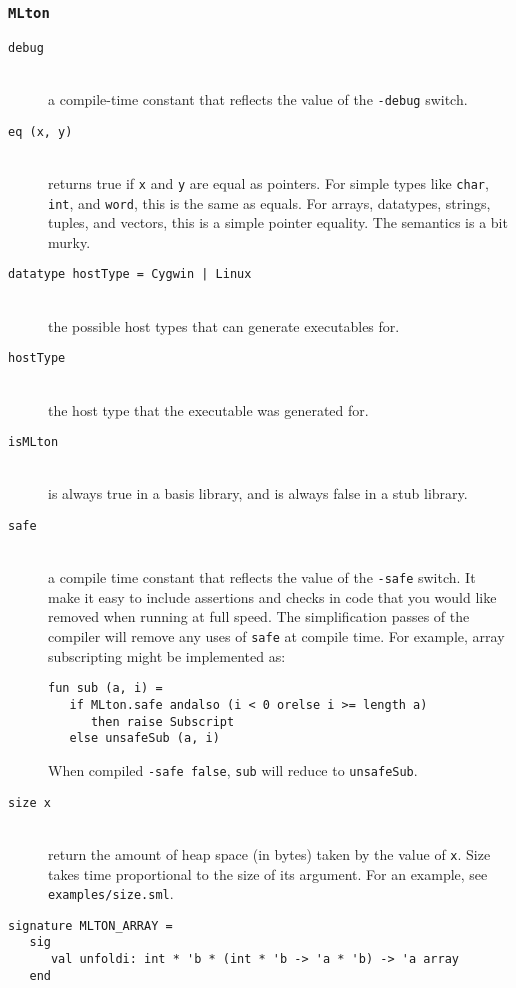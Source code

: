 \subsubsection{{\tt MLton}}

\newcommand{\entry}[1]{\item[\tt #1]\hspace{1in}\\}
\begin{description}

\entry{debug}
a compile-time constant that reflects the value of the {\tt -debug} switch.

\entry{eq (x, y)}
returns true if {\tt x} and {\tt y} are equal as pointers.  For simple types
like {\tt char}, {\tt int}, and {\tt word}, this is the same as equals.  For
arrays, datatypes, strings, tuples, and vectors, this is a simple pointer
equality.  The semantics is a bit murky.

\entry{datatype hostType = Cygwin | Linux}
the possible host types that {\mlton} can generate executables for.

\entry{hostType}
the host type that the executable was generated for.

\entry{isMLton}
is always true in a {\mlton} basis library, and is always false in a stub
library.

\entry{safe}
a compile time constant that reflects the value of the {\tt -safe} switch.  It
make it easy to include assertions and checks in code that you would like
removed when running at full speed. The simplification passes of the compiler
will remove any uses of {\tt safe} at compile time.  For example, array
subscripting might be implemented as:
\begin{verbatim}
fun sub (a, i) =
   if MLton.safe andalso (i < 0 orelse i >= length a)
      then raise Subscript
   else unsafeSub (a, i)
\end{verbatim}
When compiled {\tt -safe false}, {\tt sub} will reduce to
{\tt unsafeSub}.

\entry{size x}
return the amount of heap space (in bytes) taken by the value of {\tt x}.  Size
takes time proportional to the size of its argument.  For an example, see {\tt
examples/size.sml}.

\end{description}

\begin{verbatim}
signature MLTON_ARRAY =
   sig
      val unfoldi: int * 'b * (int * 'b -> 'a * 'b) -> 'a array
   end
\end{verbatim}

